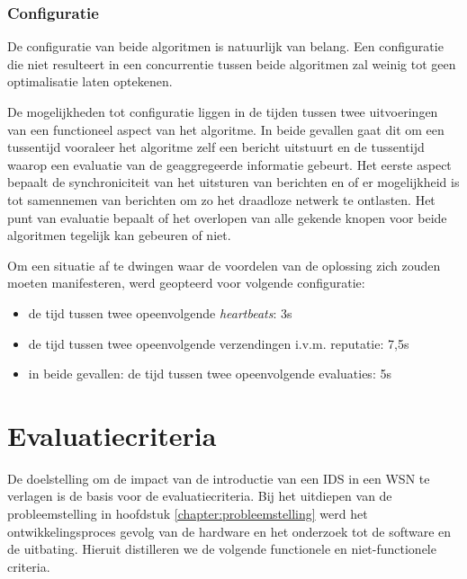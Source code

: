 \subsubsection{Configuratie}

De configuratie van beide algoritmen is natuurlijk van belang. Een configuratie
die niet resulteert in een concurrentie tussen beide algoritmen zal weinig tot
geen optimalisatie laten optekenen.

De mogelijkheden tot configuratie liggen in de tijden tussen twee uitvoeringen
van een functioneel aspect van het algoritme. In beide gevallen gaat dit om een
tussentijd vooraleer het algoritme zelf een bericht uitstuurt en de tussentijd
waarop een evaluatie van de geaggregeerde informatie gebeurt. Het eerste aspect
bepaalt de synchroniciteit van het uitsturen van berichten en of er
mogelijkheid is tot samennemen van berichten om zo het draadloze netwerk te
ontlasten. Het punt van evaluatie bepaalt of het overlopen van alle gekende
knopen voor beide algoritmen tegelijk kan gebeuren of niet.

Om een situatie af te dwingen waar de voordelen van de oplossing zich zouden
moeten manifesteren, werd geopteerd voor volgende configuratie:

\begin{itemize}[noitemsep, topsep=0pt, partopsep=0pt]

  \item de tijd tussen twee opeenvolgende \emph{heartbeats}: 3s

  \item de tijd tussen twee opeenvolgende verzendingen i.v.m. reputatie: 7,5s

  \item in beide gevallen: de tijd tussen twee opeenvolgende evaluaties: 5s

\end{itemize}

\vspace{-3mm}

\section{Evaluatiecriteria}
\label{section:criteria}

De doelstelling om de impact van de introductie van een IDS in een WSN te
verlagen is de basis voor de evaluatiecriteria. Bij het uitdiepen van de
probleemstelling in hoofdstuk \ref{chapter:probleemstelling} werd het
ontwikkelingsproces gevolg van de hardware en het onderzoek tot de software en
de uitbating. Hieruit distilleren we de volgende functionele en
niet-functionele criteria.


